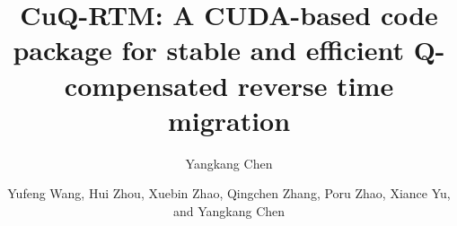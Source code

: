 

\title{CuQ-RTM: A CUDA-based code package for stable and efficient Q-compensated reverse time migration}
\author{Yangkang Chen}

\renewcommand{\thefootnote}{\fnsymbol{footnote}}

\author{Yufeng Wang\footnotemark[1], Hui Zhou\footnotemark[1], Xuebin Zhao\footnotemark[1], Qingchen Zhang\footnotemark[2], Poru Zhao\footnotemark[3], Xiance Yu\footnotemark[3], and Yangkang Chen\footnotemark[4]}


\address{
\footnotemark[1] State Key Laboratory of Petroleum Resources and Prospecting \\
China University of Petroleum \\
Fuxue Road 18th\\
Beijing, China, 102200 \\
\footnotemark[2]Research Center for Computational and Exploration Geophysics\\
 State Key Laboratory of Geodesy and Earth’s Dynamics\\
  Institute of Geodesy and Geophysics\\
   Chinese Academy of Sciences\\
    Wuhan, Hubei Province, China, 430077\\
\footnotemark[3]
China National Petroleum Corporation\\
Beijing, China. \\
\footnotemark[4]
School of Earth Sciences\\
Zhejiang University\\
Hangzhou, Zhejiang Province, China, 310027\\
yangkang.chen@zju.edu.cn 
}


